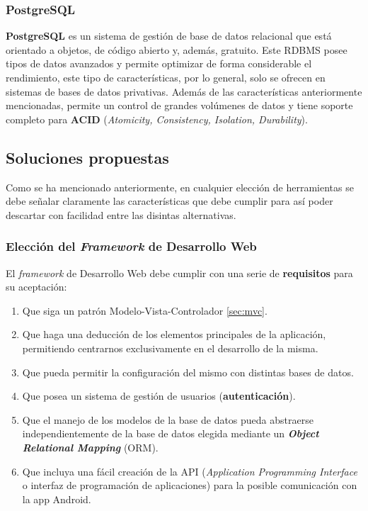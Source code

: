     \subsubsection{PostgreSQL}
    \textbf{PostgreSQL} \cite{postgresql} es un sistema de gestión de base de datos relacional
    que está orientado a objetos, de código abierto y, además, gratuito. Este RDBMS posee tipos
    de datos avanzados y permite optimizar de forma considerable el rendimiento, este tipo de
    características, por lo general, solo se ofrecen en sistemas de bases de datos privativas.
    Además de las características anteriormente mencionadas, permite un control de grandes
    volúmenes de datos y tiene soporte completo para \textbf{ACID} (\textit{Atomicity,
    Consistency, Isolation, Durability}).

\subsection{Soluciones propuestas}
Como se ha mencionado anteriormente, en cualquier elección de herramientas se debe señalar
claramente las características que debe cumplir para así poder descartar con facilidad
entre las disintas alternativas.

    \subsubsection{Elección del \textit{Framework} de Desarrollo Web}
    El \textit{framework} de Desarrollo Web debe cumplir con una serie de \textbf{requisitos} para
    su aceptación:

        \begin{enumerate}
            \item Que siga un patrón Modelo-Vista-Controlador \ref{sec:mvc}.
            \item Que haga una deducción de los elementos principales de la aplicación,
            permitiendo centrarnos exclusivamente en el desarrollo de la misma.
            \item Que pueda permitir la configuración del mismo con distintas bases de
            datos.
            \item Que posea un sistema de gestión de usuarios (\textbf{autenticación}).
            \item Que el manejo de los modelos de la base de datos pueda abstraerse
            independientemente de la base de datos elegida mediante un
            \textbf{\textit{Object Relational Mapping}} (ORM).
            \item Que incluya una fácil creación de la API (\textit{Application Programming
            Interface} o interfaz de programación de aplicaciones) para la posible
            comunicación con la app Android.
        \end{enumerate}


